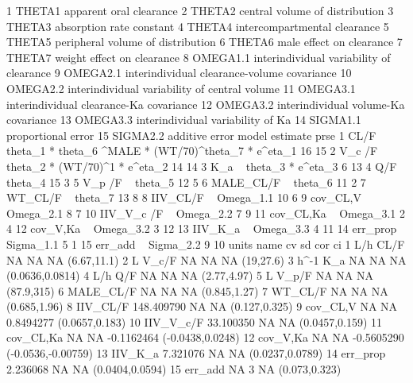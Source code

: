 \begin{Schunk}
\begin{Soutput}
1     THETA1                       apparent oral clearance
2     THETA2                central volume of distribution
3     THETA3                      absorption rate constant
4     THETA4                  intercompartmental clearance
5     THETA5             peripheral volume of distribution
6     THETA6                      male effect on clearance
7     THETA7                    weight effect on clearance
8   OMEGA1.1      interindividual variability of clearance
9   OMEGA2.1   interindividual clearance-volume covariance
10  OMEGA2.2 interindividual variability of central volume
11  OMEGA3.1       interindividual clearance-Ka covariance
12  OMEGA3.2          interindividual volume-Ka covariance
13  OMEGA3.3             interindividual variability of Ka
14  SIGMA1.1                            proportional error
15  SIGMA2.2                                additive error
                                                           model estimate prse
1  CL/F  ~ theta_1 *  theta_6 ^MALE * (WT/70)^theta_7  * e^eta_1       16   15
2                        V_c /F  ~ theta_2 * (WT/70)^1 * e^eta_2       14   14
3                                       K_a  ~ theta_3 * e^eta_3        6   13
4                                                 Q/F  ~ theta_4       15    3
5                                              V_p /F  ~ theta_5       12    5
6                                            MALE_CL/F ~ theta_6       11    2
7                                              WT_CL/F ~ theta_7       13    8
8                                           IIV_CL/F ~ Omega_1.1       10    6
9                                           cov_CL,V ~ Omega_2.1        8    7
10                                        IIV_V_c /F ~ Omega_2.2        7    9
11                                        cov_CL,Ka  ~ Omega_3.1        2    4
12                                         cov_V,Ka  ~ Omega_3.2        3   12
13                                          IIV_K_a  ~ Omega_3.3        4   11
14                                          err_prop ~ Sigma_1.1        5    1
15                                           err_add ~ Sigma_2.2        9   10
   units      name         cv sd        cor                 ci
1    L/h      CL/F         NA NA         NA        (6.67,11.1)
2      L     V_c/F         NA NA         NA          (19,27.6)
3  h^-1        K_a         NA NA         NA    (0.0636,0.0814)
4    L/h       Q/F         NA NA         NA        (2.77,4.97)
5      L     V_p/F         NA NA         NA         (87.9,315)
6        MALE_CL/F         NA NA         NA       (0.845,1.27)
7          WT_CL/F         NA NA         NA       (0.685,1.96)
8         IIV_CL/F 148.409790 NA         NA      (0.127,0.325)
9         cov_CL,V         NA NA  0.8494277     (0.0657,0.183)
10       IIV_V_c/F  33.100350 NA         NA     (0.0457,0.159)
11       cov_CL,Ka         NA NA -0.1162464   (-0.0438,0.0248)
12        cov_V,Ka         NA NA -0.5605290 (-0.0536,-0.00759)
13         IIV_K_a   7.321076 NA         NA    (0.0237,0.0789)
14        err_prop   2.236068 NA         NA    (0.0404,0.0594)
15         err_add         NA  3         NA      (0.073,0.323)
\end{Soutput}
\end{Schunk}
